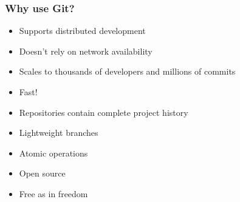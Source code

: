 \begin{frame}
    \frametitle{Why use Git?}
    \begin{itemize}
        \item Supports distributed development
        \item Doesn't rely on network availability
        \item Scales to thousands of developers and millions of commits
        \item Fast!
        \item Repositories contain complete project history
        \item Lightweight branches
        \item Atomic operations
        \item Open source
        \item Free as in freedom
    \end{itemize}
\end{frame}

